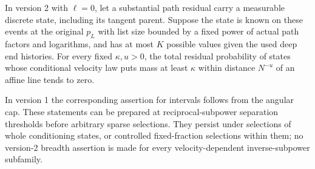 \begin{corollary}\label{a03:breadth}
In version 2 with \(\ell=0\), let a substantial path residual carry a
measurable discrete state, including its tangent parent.  Suppose the
state is known on these events at the original \(p_L\) with list size
bounded by a fixed power of actual path factors and logarithms, and has
at most \(K\) possible values given the used deep end histories.
For every fixed \(\kappa,u>0\), the total residual probability of states
whose conditional velocity law puts mass at least \(\kappa\) within
distance \(N^{-u}\) of an affine line tends to zero.

In version 1 the corresponding assertion for intervals follows from
the angular cap.  These statements can be prepared at reciprocal-subpower
separation thresholds before arbitrary sparse selections.  They persist
under selections of whole conditioning states, or controlled
fixed-fraction selections within them; no version-2 breadth assertion
is made for every velocity-dependent inverse-subpower subfamily.
\end{corollary}

